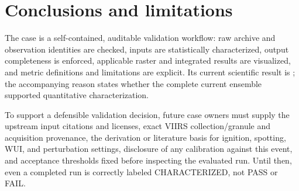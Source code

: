 \section{Conclusions and limitations}

The case is a self-contained, auditable validation workflow: raw archive
and observation identities are checked, inputs are statistically characterized,
output completeness is enforced, applicable raster and integrated results are
visualized, and metric definitions and limitations are explicit.  Its current
scientific result is \textbf{}; the accompanying reason states
whether the complete current ensemble supported quantitative characterization.

To support a defensible validation decision, future case owners must supply the
upstream input citations and licenses, exact VIIRS collection/granule and
acquisition provenance, the derivation or literature basis for ignition,
spotting, WUI, and perturbation settings, disclosure of any calibration against
this event, and acceptance thresholds fixed before inspecting the evaluated
run.  Until then, even a completed run is correctly labeled CHARACTERIZED, not
PASS or FAIL.
